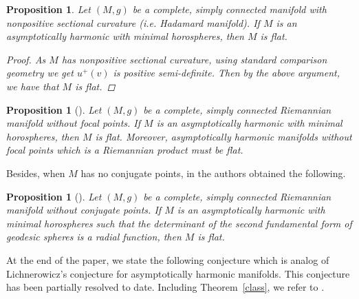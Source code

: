 \documentclass[12pt,a4paper]{amsart}
\newtheorem{Pro}[Thm]{Proposition}
\theoremstyle{definition}
\theoremstyle{remark}
\newtheorem{Rem}[Thm]{Remark}
\newcommand{\tr}{\operatorname{tr}}
\newcommand \<{\langle}
\renewcommand \>{\rangle}
\begin{document}
\begin{Pro}
    Let $(M,g)$ be a complete, simply connected manifold with nonpositive sectional curvature {\rm(}i.e. Hadamard manifold{\rm)}. If $M$ is an asymptotically harmonic with minimal horospheres, then $M$ is flat.
    \begin{proof}
        As $M$ has nonpositive sectional curvature, using standard comparison geometry we get $u^{+}(v)$ is positive semi-definite. Then by the above argument, we have that $M$ is flat.
    \end{proof}
\end{Pro}




\begin{Pro}[\cite{Z}]
     Let $(M,g)$ be a complete, simply connected Riemannian
manifold without focal points. If $M$ is an asymptotically harmonic with minimal horospheres, then $M$ is flat. Moreover, asymptotically harmonic manifolds without focal points which is a Riemannian product must be flat.
\end{Pro}


Besides, when $M$ has no conjugate points, in \cite{RS2} the authors obtained the following.
\begin{Pro}[\cite{RS2}]
    Let $(M,g)$ be a complete, simply connected Riemannian
manifold without conjugate points.  If $M$ is an asymptotically harmonic with minimal horospheres such that
{the determinant of the second fundamental form of geodesic spheres is a radial function}, then $M$ is flat.
\end{Pro}








\medskip
At the end of the paper, we state the following conjecture which is analog of Lichnerowicz's conjecture
for asymptotically harmonic manifolds. This conjecture has been partially resolved to date. Including Theorem~\ref{class}, we refer to \cite{CS, He, H, KP, S, Z}.
\end{document}
